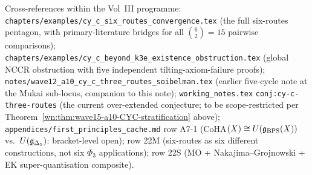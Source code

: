 Cross-references within the Vol~III programme:
\texttt{chapters/examples/cy\_c\_six\_routes\_convergence.tex}
(the full six-routes pentagon, with primary-literature bridges for
all $\binom{6}{2} = 15$ pairwise comparisons);
\texttt{chapters/examples/cy\_c\_beyond\_k3e\_existence\_obstruction.tex}
(global NCCR obstruction with five independent
tilting-axiom-failure proofs);
\texttt{notes/wave12\_a10\_cy\_c\_three\_routes\_soibelman.tex}
(earlier five-cycle note at the Mukai sub-locus, companion to this
note);
\texttt{working\_notes.tex} \texttt{conj:cy-c-three-routes}
(the current over-extended conjecture; to be scope-restricted per
Theorem~\ref{wn:thm:wave15-a10-CYC-stratification} above);
\texttt{appendices/first\_principles\_cache.md} row A7-1
(CoHA$(X) \cong U(\mathfrak{g}_{\mathrm{BPS}}(X))$ vs.\
$U(\mathfrak{g}_{\Delta_5})$: bracket-level open);
row 22M (six-routes as six different constructions, not six
$\Phi_3$ applications); row 22S (MO + Nakajima--Grojnowski + EK
super-quantisation composite).
